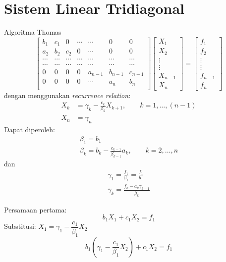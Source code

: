 \section{Sistem Linear Tridiagonal}

Algoritma Thomas
\begin{equation}
\begin{bmatrix}
b_{1} & c_{1} & 0 & \cdots & \cdots & 0 & 0 \\
a_{2} & b_{2} & c_{2} & 0 & \cdots & 0 & 0 \\
\cdots & \cdots & \cdots & \cdots & \cdots & \cdots & \cdots \\
\cdots & \cdots & \cdots & \cdots & \cdots & \cdots & \cdots \\
0 & 0 & 0 & 0 & a_{n-1} & b_{n-1} & c_{n-1} \\
0 & 0 & 0 & 0 & \cdots & a_{n} & b_{n} \\
\end{bmatrix}
\begin{bmatrix}
X_{1} \\ X_{2} \\ \vdots \\ \vdots \\ X_{n-1} \\ X_{n}
\end{bmatrix} =
\begin{bmatrix}
f_{1} \\ f_{2} \\ \vdots \\ \vdots \\ f_{n-1} \\ f_{n}
\end{bmatrix}
\end{equation}
dengan menggunakan \textit{recurrence relation}:
\begin{align}
X_{k} & = \gamma_{k} - \frac{c_{k}}{\beta_{k}} X_{k+1}, \qquad k = 1,\ldots,(n-1) \\
X_{n} & = \gamma_{n}
\end{align}
Dapat diperoleh:
\begin{align}
\beta_{1} = b_1 \\
\beta_{k} = b_{k} - \frac{c_{k-1}}{\beta_{k-1}}a_{k},\qquad k=2,\ldots,n
\end{align}
dan
\begin{align}
\gamma_{1} = \frac{f_{1}}{\beta_{1}} = \frac{f_{1}}{b_{1}} \\
\gamma_{k} = \frac{f_{k} - a_{k}\gamma_{k-1}}{\beta_{k}}
\end{align}

Persamaan pertama:
\begin{equation}
b_{1}X_{1} + c_{1}X_{2} = f_{1}
\end{equation}
Substitusi: $X_{1} = \gamma_{1} - \dfrac{c_{1}}{\beta_{1}} X_{2}$
\begin{equation}
b_{1}(\gamma_{1} - \dfrac{c_{1}}{\beta_{1}} X_{2}) + c_{1}X_{2} = f_{1}
\end{equation}